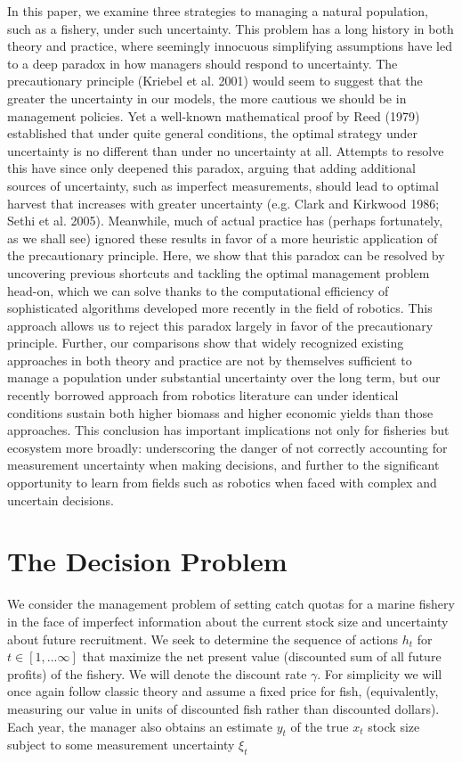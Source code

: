\documentclass[3p]{elsarticle} %
\begin{document}
In this paper, we examine three strategies to managing a natural
population, such as a fishery, under such uncertainty. This problem has
a long history in both theory and practice, where seemingly innocuous
simplifying assumptions have led to a deep paradox in how managers
should respond to uncertainty. The precautionary principle (Kriebel et
al. 2001) would seem to suggest that the greater the uncertainty in our
models, the more cautious we should be in management policies. Yet a
well-known mathematical proof by Reed (1979) established that under
quite general conditions, the optimal strategy under uncertainty is no
different than under no uncertainty at all. Attempts to resolve this
have since only deepened this paradox, arguing that adding additional
sources of uncertainty, such as imperfect measurements, should lead to
optimal harvest that increases with greater uncertainty (e.g. Clark and
Kirkwood 1986; Sethi et al. 2005). Meanwhile, much of actual practice
has (perhaps fortunately, as we shall see) ignored these results in
favor of a more heuristic application of the precautionary principle.
Here, we show that this paradox can be resolved by uncovering previous
shortcuts and tackling the optimal management problem head-on, which we
can solve thanks to the computational efficiency of sophisticated
algorithms developed more recently in the field of robotics. This
approach allows us to reject this paradox largely in favor of the
precautionary principle. Further, our comparisons show that widely
recognized existing approaches in both theory and practice are not by
themselves sufficient to manage a population under substantial
uncertainty over the long term, but our recently borrowed approach from
robotics literature can under identical conditions sustain both higher
biomass and higher economic yields than those approaches. This
conclusion has important implications not only for fisheries but
ecosystem more broadly: underscoring the danger of not correctly
accounting for measurement uncertainty when making decisions, and
further to the significant opportunity to learn from fields such as
robotics when faced with complex and uncertain decisions.

\hypertarget{the-decision-problem}{%
\section{The Decision Problem}\label{the-decision-problem}}

We consider the management problem of setting catch quotas for a marine
fishery in the face of imperfect information about the current stock
size and uncertainty about future recruitment. We seek to determine the
sequence of actions \(h_t\) for \(t \in [1, ... \infty]\) that maximize
the net present value (discounted sum of all future profits) of the
fishery. We will denote the discount rate \(\gamma\). For simplicity we
will once again follow classic theory and assume a fixed price for fish,
(equivalently, measuring our value in units of discounted fish rather
than discounted dollars). Each year, the manager also obtains an
estimate \(y_t\) of the true \(x_t\) stock size subject to some
measurement uncertainty \(\xi_t\)
\end{document}
